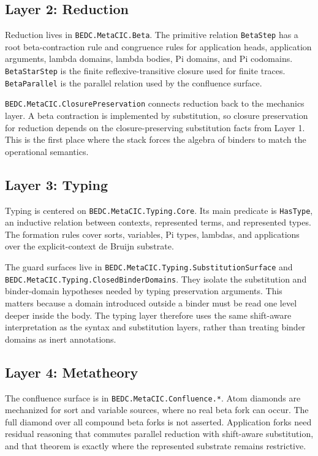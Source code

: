 \subsection{Layer 2: Reduction}
\label{subsec:substrate-layer-reduction}

Reduction lives in \texttt{BEDC.MetaCIC.Beta}. The primitive relation
\texttt{BetaStep} has a root beta-contraction rule and congruence rules for
application heads, application arguments, lambda domains, lambda bodies, Pi
domains, and Pi codomains. \texttt{BetaStarStep} is the finite
reflexive-transitive closure used for finite traces. \texttt{BetaParallel} is
the parallel relation used by the confluence surface.

\texttt{BEDC.MetaCIC.ClosurePreservation} connects reduction back to the
mechanics layer. A beta contraction is implemented by substitution, so closure
preservation for reduction depends on the closure-preserving substitution
facts from Layer 1. This is the first place where the stack forces the algebra
of binders to match the operational semantics.

\subsection{Layer 3: Typing}
\label{subsec:substrate-layer-typing}

Typing is centered on \texttt{BEDC.MetaCIC.Typing.Core}. Its main predicate is
\texttt{HasType}, an inductive relation between contexts, represented terms,
and represented types. The formation rules cover sorts, variables, Pi types,
lambdas, and applications over the explicit-context de Bruijn substrate.

The guard surfaces live in
\texttt{BEDC.MetaCIC.Typing.SubstitutionSurface} and
\texttt{BEDC.MetaCIC.Typing.ClosedBinderDomains}. They isolate the
substitution and binder-domain hypotheses needed by typing preservation
arguments. This matters because a domain introduced outside a binder must be
read one level deeper inside the body. The typing layer therefore uses the
same shift-aware interpretation as the syntax and substitution layers, rather
than treating binder domains as inert annotations.

\subsection{Layer 4: Metatheory}
\label{subsec:substrate-layer-metatheory}

The confluence surface is in \texttt{BEDC.MetaCIC.Confluence.*}. Atom
diamonds are mechanized for sort and variable sources, where no real beta fork
can occur. The full diamond over all compound beta forks is not asserted.
Application forks need residual reasoning that commutes parallel reduction
with shift-aware substitution, and that theorem is exactly where the
represented substrate remains restrictive.

